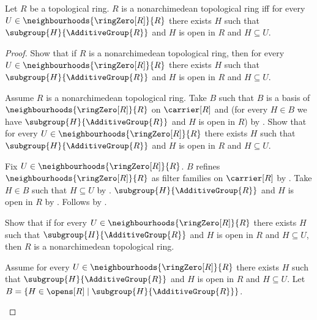 \begin{theorem}\label{nonarchimedean_topological_ring_iff_open_subgroup_refinement}
    Let $R$ be a topological ring.
    $R$ is a nonarchimedean topological ring iff
        for every $U\in\neighbourhoods{\ringZero[R]}{R}$ there exists $H$
            such that $\subgroup{H}{\AdditiveGroup{R}}$ and
                $H$ is open in $R$ and $H\subseteq U$.
\end{theorem}
\begin{proof}
    Show that if $R$ is a nonarchimedean topological ring, then
        for every $U\in\neighbourhoods{\ringZero[R]}{R}$ there exists $H$
            such that $\subgroup{H}{\AdditiveGroup{R}}$ and
                $H$ is open in $R$ and $H\subseteq U$.
    \begin{subproof}
        Assume $R$ is a nonarchimedean topological ring.
        Take $B$ such that $B$ is a basis of
            $\neighbourhoods{\ringZero[R]}{R}$ on $\carrier[R]$ and
            (for every $H\in B$ we have
                $\subgroup{H}{\AdditiveGroup{R}}$ and $H$ is open in $R$)
            by .
        Show that for every $U\in\neighbourhoods{\ringZero[R]}{R}$
            there exists $H$ such that
                $\subgroup{H}{\AdditiveGroup{R}}$ and
                $H$ is open in $R$ and $H\subseteq U$.
        \begin{subproof}
            Fix $U\in\neighbourhoods{\ringZero[R]}{R}$.
            $B$ refines $\neighbourhoods{\ringZero[R]}{R}$
                as filter families on $\carrier[R]$ by
                .
            Take $H\in B$ such that $H\subseteq U$ by
                .
            $\subgroup{H}{\AdditiveGroup{R}}$ and $H$ is open in $R$
                by \auto.
            Follows by \auto.
        \end{subproof}
    \end{subproof}
    Show that if for every $U\in\neighbourhoods{\ringZero[R]}{R}$
        there exists $H$
            such that $\subgroup{H}{\AdditiveGroup{R}}$ and
                $H$ is open in $R$ and $H\subseteq U$, then
        $R$ is a nonarchimedean topological ring.
    \begin{subproof}
        Assume for every $U\in\neighbourhoods{\ringZero[R]}{R}$
            there exists $H$
                such that $\subgroup{H}{\AdditiveGroup{R}}$ and
                    $H$ is open in $R$ and $H\subseteq U$.
        Let $B=\{H\in\opens[R]\mid
            \subgroup{H}{\AdditiveGroup{R}}\}$.

\end{subproof}
\end{proof}
